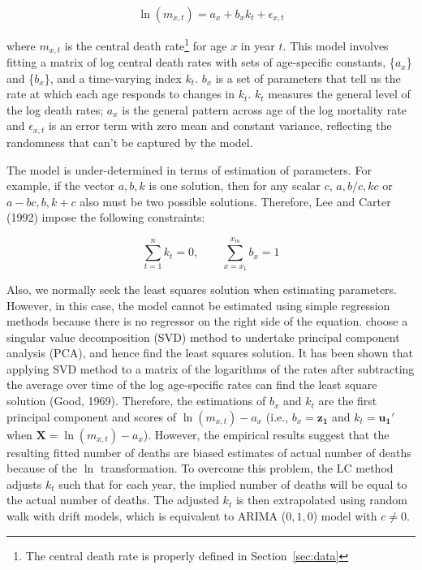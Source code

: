 \documentclass[11pt,a4paper,]{article}
\begin{document}
\begin{equation}
  \ln(m_{x,t})=a_x+b_xk_t+\epsilon_{x,t}
\end{equation}

where \(m_{x,t}\) is the central death
rate\footnote{The central death rate is properly defined in Section~\ref{sec:data}}
for age \(x\) in year \(t\). This model involves fitting a matrix of log
central death rates with sets of age-specific constants, \{\(a_x\)\} and
\{\(b_x\)\}, and a time-varying index \(k_t\). \(b_x\) is a set of
parameters that tell us the rate at which each age responds to changes
in \(k_t\). \(k_t\) measures the general level of the log death rates;
\(a_x\) is the general pattern across age of the log mortality rate and
\(\epsilon_{x,t}\) is an error term with zero mean and constant
variance, reflecting the randomness that can't be captured by the model.

The model is under-determined in terms of estimation of parameters. For
example, if the vector \(a,b,k\) is one solution, then for any scalar
\(c\), \(a, b/c, kc\) or \(a - bc, b, k+c\) also must be two possible
solutions. Therefore, Lee and Carter (1992) impose the following
constraints:

\begin{equation}
  \sum_{t=1}^{n}k_t=0, \qquad \sum_{x=x_1}^{x_m}b_x=1
\end{equation}

Also, we normally seek the least squares solution when estimating
parameters. However, in this case, the model cannot be estimated using
simple regression methods because there is no regressor on the right
side of the equation. \textcite{LC92} choose a singular value
decomposition (SVD) method to undertake principal component analysis
(PCA), and hence find the least squares solution. It has been shown that
applying SVD method to a matrix of the logarithms of the rates after
subtracting the average over time of the log age-specific rates can find
the least square solution (Good, 1969). Therefore, the estimations of
\(b_x\) and \(k_t\) are the first principal component and scores of
\(\ln(m_{x,t})-a_x\) (i.e., \(b_x=\bm{z_1}\) and \(k_t=\bm{u_1}'\) when
\(\bm{X}=\ln(m_{x,t})-a_x\)). However, the empirical results suggest
that the resulting fitted number of deaths are biased estimates of
actual number of deaths because of the \(\ln\) transformation. To
overcome this problem, the LC method adjusts \(k_t\) such that for each
year, the implied number of deaths will be equal to the actual number of
deaths. The adjusted \(k_t\) is then extrapolated using random walk with
drift models, which is equivalent to ARIMA (\(0,1,0\)) model with
\(c\neq0\).
\end{document}
